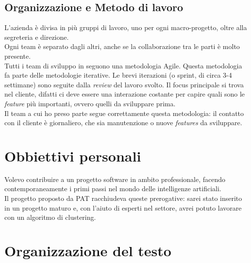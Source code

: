 \subsection{Organizzazione e Metodo di lavoro}
L'azienda è divisa in più gruppi di lavoro, uno per ogni macro-progetto, oltre alla segreteria e direzione.\\
Ogni team è separato dagli altri, anche se la collaborazione tra le parti è molto presente.\\
Tutti i team di sviluppo in \company seguono una metodologia Agile. Questa metodologia fa parte delle metodologie iterative. Le brevi iterazioni (o sprint, di circa 3-4 settimane) sono seguite dalla \textit{review} del lavoro svolto. Il focus principale si trova nel cliente, difatti ci deve essere una interazione costante per capire quali sono le \textit{feature} più importanti, ovvero quelli da sviluppare prima.\\
Il team a cui ho preso parte segue correttamente questa metodologia: il contatto con il cliente è giornaliero, che sia manutenzione o nuove \textit{features} da sviluppare.
\section{Obbiettivi personali}

Volevo contribuire a un progetto software in ambito professionale, facendo contemporaneamente i primi passi nel mondo delle intelligenze artificiali.\\
Il progetto proposto da PAT racchiudeva queste prerogative: sarei stato inserito in un progetto maturo e, con l'aiuto di esperti nel settore, avrei potuto lavorare con un algoritmo di clustering.   

\section{Organizzazione del testo}

